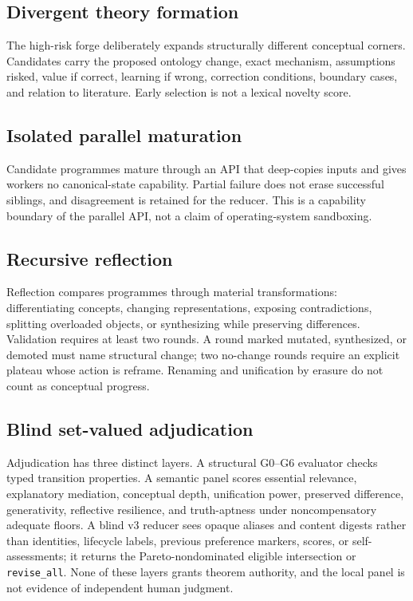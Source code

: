 \documentclass[11pt]{article}
\begin{document}
\subsection{Divergent theory formation}

The high-risk forge deliberately expands structurally different conceptual corners. Candidates carry the proposed ontology change, exact mechanism, assumptions risked, value if correct, learning if wrong, correction conditions, boundary cases, and relation to literature. Early selection is not a lexical novelty score.

\subsection{Isolated parallel maturation}

Candidate programmes mature through an API that deep-copies inputs and gives workers no canonical-state capability. Partial failure does not erase successful siblings, and disagreement is retained for the reducer. This is a capability boundary of the parallel API, not a claim of operating-system sandboxing.

\subsection{Recursive reflection}

Reflection compares programmes through material transformations: differentiating concepts, changing representations, exposing contradictions, splitting overloaded objects, or synthesizing while preserving differences. Validation requires at least two rounds. A round marked mutated, synthesized, or demoted must name structural change; two no-change rounds require an explicit plateau whose action is reframe. Renaming and unification by erasure do not count as conceptual progress.

\subsection{Blind set-valued adjudication}

Adjudication has three distinct layers. A structural G0--G6 evaluator checks typed transition properties. A semantic panel scores essential relevance, explanatory mediation, conceptual depth, unification power, preserved difference, generativity, reflective resilience, and truth-aptness under noncompensatory adequate floors. A blind v3 reducer sees opaque aliases and content digests rather than identities, lifecycle labels, previous preference markers, scores, or self-assessments; it returns the Pareto-nondominated eligible intersection or \texttt{revise\_all}. None of these layers grants theorem authority, and the local panel is not evidence of independent human judgment.
\end{document}
